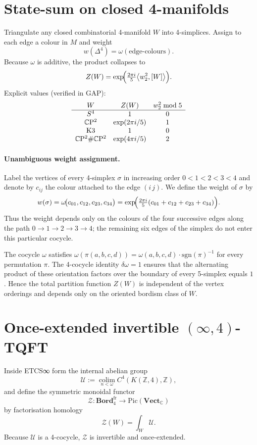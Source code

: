 \documentclass[11pt]{article}
\begin{document}
\section{State-sum on closed 4-manifolds}
Triangulate any closed combinatorial 4-manifold $W$ into 4-simplices.  Assign to each edge a colour in $M$ and weight
\[
w(\Delta^{4})=\omega(\text{edge-colours}).
\]
Because $\omega$ is additive, the product collapses to
\[
Z(W)=\exp\!\Bigl(\tfrac{2\pi i}{5}\bigl\langle w_{2}^{2},[W]\bigr\rangle\Bigr).
\]
Explicit values (verified in GAP):
\[
\begin{array}{c@{\quad}c@{\quad}c}
W & Z(W) & w_{2}^{2}\bmod 5 \\
\hline
S^{4} & 1 & 0 \\
\mathbb C\mathrm P^{2} & \exp(2\pi i/5) & 1 \\
\mathrm{K3} & 1 & 0 \\
\mathbb C\mathrm P^{2}\#\mathbb C\mathrm P^{2} & \exp(4\pi i/5) & 2
\end{array}
\]

\paragraph{Unambiguous weight assignment.}
Label the vertices of every 4-simplex $\sigma$ in increasing order $0<1<2<3<4$ and denote by $c_{i j}$ the colour attached to the edge $(i\,j)$.
We define the weight of $\sigma$ by
\[
w(\sigma)=\omega\!\bigl(c_{01},c_{12},c_{23},c_{34}\bigr)=
\exp\!\Bigl(\tfrac{2\pi i}{5}(c_{01}+c_{12}+c_{23}+c_{34})\Bigr).
\]
Thus the weight depends only on the colours of the four successive edges along the path $0\to1\to2\to3\to4$; the remaining six edges of the simplex do not enter this particular cocycle.

\begin{remark}
The cocycle $\omega$ satisfies $\omega(\pi(a,b,c,d)) = \omega(a,b,c,d)\cdot\mathrm{sgn}(\pi)^{-1}$ for every permutation $\pi$.
The 4-cocycle identity $\delta\omega = 1$ ensures that the alternating product of these orientation factors over the boundary of every 5-simplex equals $1$.
Hence the total partition function $Z(W)$ is independent of the vertex orderings and depends only on the oriented bordism class of $W$.
\end{remark}

\section{Once-extended invertible $(\infty,4)$-TQFT}
Inside ETCS∞ form the internal abelian group
\[
\mathcal U:=\operatorname*{colim}_{n<\omega}C^{4}(K(\mathbb Z,4),\mathbb Z),
\]
and define the symmetric monoidal functor
\[
\mathcal Z\colon\mathbf{Bord}_{4}^{\mathrm{fr}}\longrightarrow\mathrm{Pic}(\mathbf{Vect}_{\mathbb C})
\]
by factorisation homology
\[
\mathcal Z(W)=\int_{W}\mathcal U.
\]
Because $\mathcal U$ is a 4-cocycle, $\mathcal Z$ is invertible and once-extended.
\end{document}
